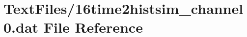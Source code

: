 \hypertarget{16time2histsim__channel0_8dat}{}\section{Text\+Files/16time2histsim\+\_\+channel0.dat File Reference}
\label{16time2histsim__channel0_8dat}
